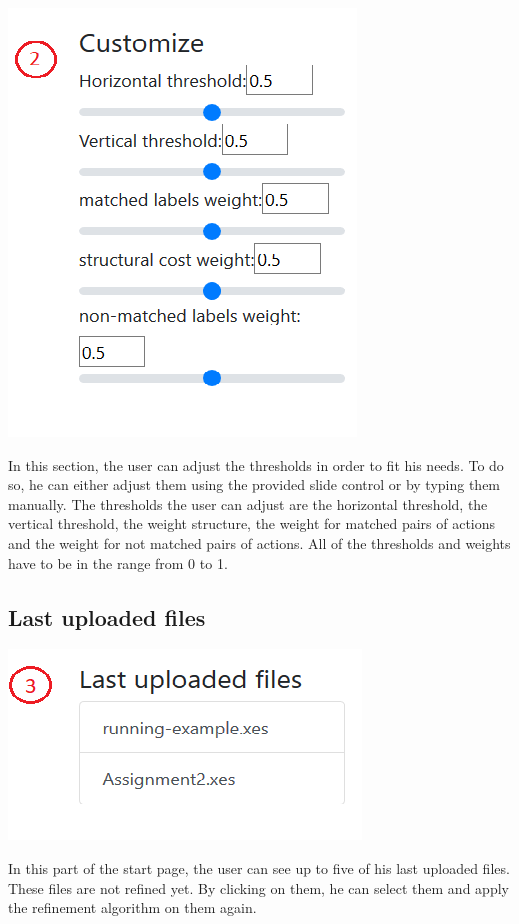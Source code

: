 \documentclass[notitlepage]{article}
\begin{document}
\begin{flushleft}
\includegraphics[scale=0.5]{customize.png}

In this section, the user can adjust the thresholds in order to fit his needs. To do so, he can either adjust them using the provided slide control or by typing them manually. The thresholds the user can adjust are the horizontal threshold, the vertical threshold, the weight structure, the weight for matched pairs of actions and the weight for not matched pairs of actions. All of the thresholds and weights have to be in the range from 0 to 1.

\subsection{Last uploaded files}

\includegraphics[scale=0.5]{lastUploadedFiles.png}

In this part of the start page, the user can see up to five of his last uploaded files. These files are not refined yet. By clicking on them, he can select them and apply the refinement algorithm on them again.


\end{flushleft}
\end{document}
